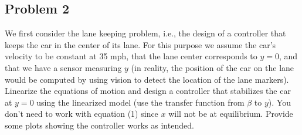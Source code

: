 \documentclass{article}
\begin{document}
\subsection*{Problem 2}
We first consider the lane keeping problem, i.e., the design of a controller that keeps the car in the center of its lane. For this purpose we assume the car’s velocity to be constant at 35 mph, that the lane center corresponds to $y = 0$, and that we have a sensor measuring $y$ (in reality, the position of the car on the lane would be computed by using vision to detect the location of the lane markers). Linearize the equations of motion and design a controller that stabilizes the car at $y = 0$ using the linearized model (use the transfer function from $\beta$ to $y$). You don’t need to work with equation (1) since $x$ will not be at equilibrium. Provide some plots showing the controller works as intended.
\end{document}
